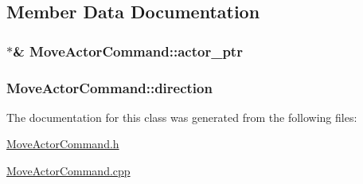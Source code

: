 \subsection{Member Data Documentation}
\hypertarget{class_move_actor_command_a1385801ea83705b51333acef7315c7bc}{}
\subsubsection[{actor\+\_\+ptr}]{$\ast$\& Move\+Actor\+Command\+::actor\+\_\+ptr\hspace{0.3cm}{\ttfamily [private]}}\label{class_move_actor_command_a1385801ea83705b51333acef7315c7bc}
\hypertarget{class_move_actor_command_aa28d07b900906c1e740d30bd877d2afe}{}
\subsubsection[{direction}]{ Move\+Actor\+Command\+::direction\hspace{0.3cm}{\ttfamily [private]}}\label{class_move_actor_command_aa28d07b900906c1e740d30bd877d2afe}


The documentation for this class was generated from the following files\+:\begin{DoxyCompactItemize}
\item 
\hyperlink{_move_actor_command_8h}{Move\+Actor\+Command.\+h}\item 
\hyperlink{_move_actor_command_8cpp}{Move\+Actor\+Command.\+cpp}\end{DoxyCompactItemize}
